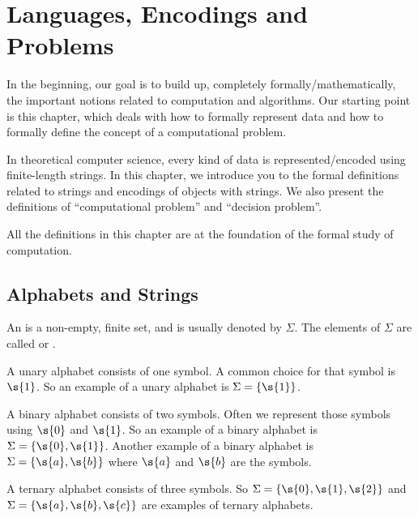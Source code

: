 \chapter{Languages, Encodings and Problems}
\label{chapter:Languages-Encodings-and-Problems}
\begin{preamble}
In the beginning, our goal is to build up, completely formally/mathematically, the important notions related to computation and algorithms. Our starting point is this chapter, which deals with how to formally represent data and how to formally define the concept of a computational problem.

In theoretical computer science, every kind of data is represented/encoded using finite-length strings. In this chapter, we introduce you to the formal definitions related to strings and encodings of objects with strings. We also present the definitions of ``computational problem'' and ``decision problem''. 

All the definitions in this chapter are at the foundation of the formal study of computation.
\end{preamble}
\section{Alphabets and Strings}
\label{section:Alphabets-and-Strings}
\begin{flex}
\begin{definition} \label{definition:Alphabet-symbol-character}
An  is a non-empty, finite set, and is usually denoted by $\Sigma$. 
The elements of $\Sigma$ are called  or .
\end{definition}

\begin{example} \label{example:Unary-alphabet}
A unary alphabet consists of one symbol. A common choice for that symbol is $\s{1}$. 
So an example of a unary alphabet is $\Sigma = \{\s{1}\}$.
\end{example}

\begin{example} \label{example:Binary-alphabet}
A binary alphabet consists of two symbols. 
Often we represent those symbols using $\s{0}$ and $\s{1}$. 
So an example of a binary alphabet is $\Sigma = \{\s{0},\s{1}\}$.
Another example of a binary alphabet is $\Sigma=\{\s{a},\s{b}\}$ where $\s{a}$ and $\s{b}$ are the symbols.
\end{example}

\begin{example} \label{example:Ternary-alphabet}
A ternary alphabet consists of three symbols. 
So $\Sigma=\{\s{0},\s{1},\s{2}\}$ and $\Sigma=\{\s{a},\s{b},\s{c}\}$ are examples of ternary alphabets. 
\end{example}
\end{flex}

